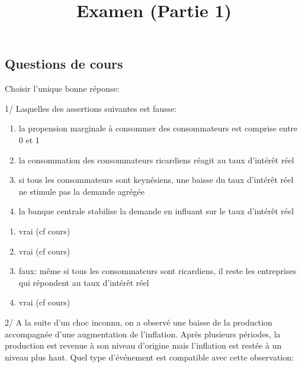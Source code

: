 \documentclass[
  letterpaper,
  DIV=11,
  numbers=noendperiod]{scrartcl}
\title{Examen (Partie 1)}
\author{}
\date{}
\providecommand{\tightlist}{%
  \setlength{\itemsep}{0pt}\setlength{\parskip}{0pt}}\usepackage{longtable,booktabs,array}
\begin{document}
\maketitle

\subsection{Questions de cours}\label{questions-de-cours}

Choisir l'unique bonne réponse:

1/ Laquelles des assertions suivantes est fausse:

\begin{enumerate}
\def\labelenumi{\alph{enumi}.}
\tightlist
\item
  la propension marginale à consommer des consommateurs est comprise
  entre 0 et 1
\item
  la consommation des consommateurs ricardiens réagit au taux d'intérêt
  réel
\item
  si tous les consommateurs sont keynésiens, une baisse du taux
  d'intérêt réel ne stimule pas la demande agrégée
\item
  la banque centrale stabilise la demande en influant sur le taux
  d'intérêt réel
\end{enumerate}

\begin{tcolorbox}[enhanced jigsaw, colbacktitle=quarto-callout-warning-color!10!white, rightrule=.15mm, left=2mm, leftrule=.75mm, colframe=quarto-callout-warning-color-frame, titlerule=0mm, colback=white, toptitle=1mm, bottomtitle=1mm, breakable, coltitle=black, title=\textcolor{quarto-callout-warning-color}{\faExclamationTriangle}\hspace{0.5em}{Correction}, bottomrule=.15mm, opacityback=0, arc=.35mm, toprule=.15mm, opacitybacktitle=0.6]

\begin{enumerate}
\def\labelenumi{\alph{enumi}.}
\tightlist
\item
  vrai (cf cours)
\item
  vrai (cf cours)
\item
  faux: même si tous les consommateurs sont ricardiens, il reste les
  entreprises qui répondent au taux d'intérêt réel
\item
  vrai (cf cours)
\end{enumerate}

\end{tcolorbox}

2/ A la suite d'un choc inconnu, on a observé une baisse de la
production accompagnée d'une augmentation de l'inflation. Après
plusieurs périodes, la production est revenue à son niveau d'origine
mais l'inflation est restée à un niveau plus haut. Quel type d'événement
est compatible avec cette observation:
\end{document}
